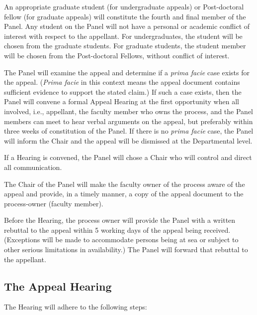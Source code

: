  An appropriate graduate student (for undergraduate appeals) or
Post-doctoral fellow (for graduate appeals) will constitute the fourth and
final member of the Panel.  Any student on the Panel will not have a personal
or academic conflict of interest with respect to the appellant.  For
undergraduates, the student will be chosen from the graduate students.  For
graduate students, the student member will be chosen from the Post-doctoral
Fellows, without conflict of interest.  

 The Panel will examine the appeal and determine if a \emph{prima
facie} case exists for the appeal.  (\emph{Prima facie} in this context means
the appeal document contains sufficient evidence to support the stated claim.)
If such a case exists, then the Panel will convene a formal Appeal Hearing at
the first opportunity when all involved, i.e., appellant, the faculty member
who owns the process, and the Panel members can meet to hear verbal arguments
on the appeal, but preferably within three weeks of constitution of the Panel.
If there is no \emph{prima facie} case, the Panel will inform the Chair and the
appeal will be dismissed at the Departmental level.

 If a Hearing is convened, the Panel will chose a Chair who will
control and direct all communication.

 The Chair of the Panel will make the faculty owner of the process
aware of the appeal and provide, in a timely manner, a copy of the appeal
document to the process-owner (faculty member).  

 Before the Hearing, the process owner will provide the Panel with a
written rebuttal to the appeal within 5 working days of the appeal being
received.  (Exceptions will be made to accommodate persons being at sea or
subject to other serious limitations in availability.)  The Panel will forward
that rebuttal to the appellant.


\subsection{The Appeal Hearing}

 The Hearing will adhere to the following steps:

